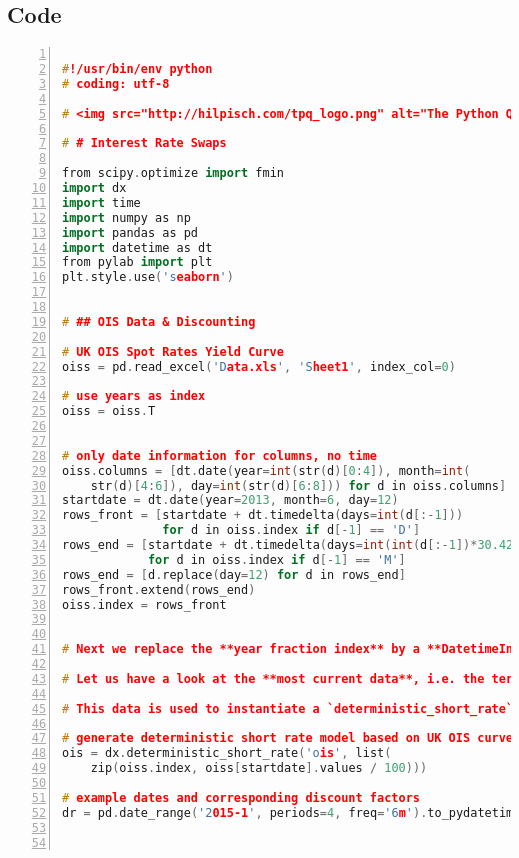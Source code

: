 \documentclass[a4paper, 11pt]{article}
\begin{document}
\subsection{Code}
\begin{lstlisting}[language = C++, numbers=left, 
         numberstyle=\tiny,keywordstyle=\color{blue!70},
         commentstyle=\color{red!50!green!50!blue!50},frame=shadowbox,
         rulesepcolor=\color{red!20!green!20!blue!20},basicstyle=\ttfamily]

#!/usr/bin/env python
# coding: utf-8

# <img src="http://hilpisch.com/tpq_logo.png" alt="The Python Quants" width="45%" align="right" border="4">

# # Interest Rate Swaps

from scipy.optimize import fmin
import dx
import time
import numpy as np
import pandas as pd
import datetime as dt
from pylab import plt
plt.style.use('seaborn')


# ## OIS Data & Discounting

# UK OIS Spot Rates Yield Curve
oiss = pd.read_excel('Data.xls', 'Sheet1', index_col=0)

# use years as index
oiss = oiss.T


# only date information for columns, no time
oiss.columns = [dt.date(year=int(str(d)[0:4]), month=int(
    str(d)[4:6]), day=int(str(d)[6:8])) for d in oiss.columns]
startdate = dt.date(year=2013, month=6, day=12)
rows_front = [startdate + dt.timedelta(days=int(d[:-1]))
              for d in oiss.index if d[-1] == 'D']
rows_end = [startdate + dt.timedelta(days=int(int(d[:-1])*30.42))
            for d in oiss.index if d[-1] == 'M']
rows_end = [d.replace(day=12) for d in rows_end]
rows_front.extend(rows_end)
oiss.index = rows_front


# Next we replace the **year fraction index** by a **DatetimeIndex**.

# Let us have a look at the **most current data**, i.e. the term structure, of the data set.

# This data is used to instantiate a `deterministic_short_rate` **model for risk-neutral discounting** purposes.

# generate deterministic short rate model based on UK OIS curve
ois = dx.deterministic_short_rate('ois', list(
    zip(oiss.index, oiss[startdate].values / 100)))

# example dates and corresponding discount factors
dr = pd.date_range('2015-1', periods=4, freq='6m').to_pydatetime()



\end{lstlisting}
\end{document}
